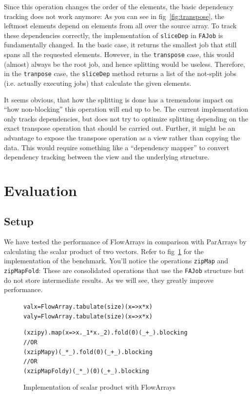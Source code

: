 \documentclass[runningheads,a4paper,fleqn]{llncs}
\begin{document}
Since this operation changes the order of the elements, the basic
dependency tracking does not work anymore: As you can see in
fig~\ref{fig:transpose}, the leftmost elements depend on elements from
all over the source array. To track these dependencies correctly, the
implementation of \texttt{sliceDep} in \texttt{FAJob} is fundamentally
changed. In the 
basic case, it returns the smallest job that still spans all the
requested elements. However, in the \texttt{transpose} case, this
would (almost)
always be the root job, and hence splitting would be useless. Therefore,
in the \texttt{tranpose} case, the \texttt{sliceDep} method returns a
list of the not-split jobs (i.e. actually executing jobs) that
calculate the given elements.

It seems obvious, that how the splitting is done has a tremendous
impact on ``how non-blocking'' this operation will end up to be. The
current implementation only tracks dependencies, but does not try to
optimize splitting depending on the exact transpose operation that
should be carried out. Further, it might be an advantage to expose the
transpose operation as a view rather than copying the data. This would
require something like a ``dependency mapper'' to convert dependency
tracking between the view and the underlying structure.

\section{Evaluation}
\label{sec:evaluation}

\subsection{Setup}

We have tested the performance of FlowArrays in comparison with
ParArrays by calculating the scalar product of two vectors. Refer to
fig~\ref{fig:scalar-product} for the implementation of the
benchmark. You'll notice the operations \texttt{zipMap} and
\texttt{zipMapFold}: These are consolidated operations that use the
\texttt{FAJob} structure but do not store intermediate results. As we
will see, they greatly improve performance.

\begin{figure}
\begin{minipage}[t]{6cm}
\begin{alltt}
{\scriptsize
val x = FlowArray.tabulate(size)(x => x*x)
val y = FlowArray.tabulate(size)(x => x*x)

(x zip y).map(x => x._1 * x._2).fold(0)(_ + _).blocking
// OR
(x zipMap y)(_ * _).fold(0)(_ + _).blocking
// OR
(x zipMapFold y)(_ * _)(0)(_ + _).blocking
}
\end{alltt}
\end{minipage}
\caption{Implementation of scalar product with FlowArrays}
\label{fig:scalar-product}
\end{figure}
\end{document}
